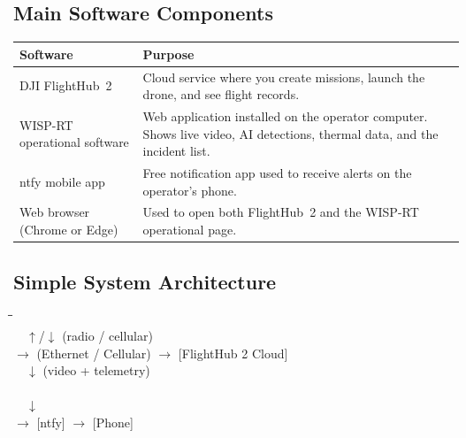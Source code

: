 \documentclass[11pt,letterpaper]{article}
\begin{document}
\subsection{Main Software Components}
\label{sec:overview-software}

\begin{tabular}{@{}p{4.5cm}p{10.5cm}@{}}
\toprule
\textbf{Software} & \textbf{Purpose} \\
\midrule
DJI FlightHub~2      & Cloud service where you create missions, launch the drone, and see flight records. \\
WISP-RT operational software & Web application installed on the operator computer. Shows live video, AI detections, thermal data, and the incident list. \\
ntfy mobile app      & Free notification app used to receive alerts on the operator's phone. \\
Web browser (Chrome or Edge) & Used to open both FlightHub~2 and the WISP-RT operational page. \\
\bottomrule
\end{tabular}

\subsection{Simple System Architecture}

\begin{center}
\begin{tcolorbox}[colback=uavlight, colframe=uavblue, boxrule=0.6pt, arc=2pt,
  width=0.95\textwidth]
\ttfamily\small
\begin{tabbing}
\hspace{0.5cm}\=\hspace{4.5cm}\=\hspace{4.5cm}\= \kill
{} \\
\> \ \ $\uparrow$/$\downarrow$ (radio / cellular) \\
 $\longrightarrow$ (Ethernet / Cellular) $\longrightarrow$ [FlightHub 2 Cloud] \\
\> \ \ $\downarrow$ (video + telemetry) \\
 \\
\> \ \ $\downarrow$ \\
 $\longrightarrow$ [ntfy] $\longrightarrow$ [Phone] \\
\end{tabbing}
\end{tcolorbox}
\end{center}
\end{document}
